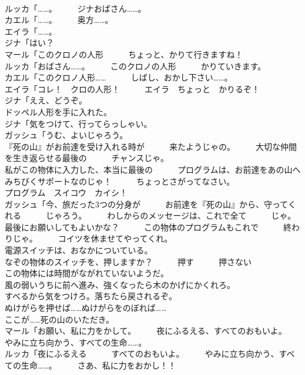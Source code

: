 \documentclass[8pt]{extreport}
\begin{document}
\begin{CJK}{UTF8}{min}
\\	ルッカ「……。　　　ジナおばさん……。	
\\	カエル「……。　　　奥方……。	
\\	エイラ「……。	
\\	ジナ「はい？	
\\	マール「このクロノの人形　　　ちょっと、かりて行きますね！	
\\	ルッカ「おばさん……。　　　このクロノの人形　　　かりていきます。	
\\	カエル「このクロノ人形……　　　しばし、おかし下さい……。	
\\	エイラ「コレ！　クロの人形！　　　エイラ　ちょっと　かりるぞ！	
\\	ジナ「ええ、どうぞ。	
\\	ドッペル人形を手に入れた。	
\\	ジナ「気をつけて、行ってらっしゃい。	
\\	ガッシュ「うむ、よいじゃろう。	
\\	『死の山』がお前達を受け入れる時が　　　来たようじゃの。　　　大切な仲間を生き返らせる最後の　　　チャンスじゃ。	
\\	私がこの物体に入力した、本当に最後の　　　プログラムは、お前達をあの山へ　　　みちびくサポートなのじゃ！　　　ちょっとさがってなさい。	
\\	プログラム　スイコウ　カイシ！	
\\	ガッシュ「今、旅だった3つの分身が　　　お前達を『死の山』から、守ってくれる　　　じゃろう。　　　わしからのメッセージは、これで全て　　　じゃ。	
\\	最後にお願いしてもよいかな？　　　この物体のプログラムもこれで　　　終わりじゃ。　　　コイツを休ませてやってくれ。	
\\	電源スイッチは、おなかについている。	
\\	なぞの物体のスイッチを、押しますか？　　　押す　　　押さない	
\\	この物体には時間がながれていないようだ。	
\\	風の弱いうちに前へ進み、強くなったら木のかげにかくれろ。	
\\	すべるから気をつけろ。落ちたら戻されるぞ。	
\\	ぬけがらを押せば……ぬけがらをのぼれば……	
\\	ここが……死の山のいただき。	
\\	マール「お願い、私に力をかして。　　　夜にふるえる、すべてのおもいよ。　　　やみに立ち向かう、すべての生命……。	
\\	ルッカ「夜にふるえる　　　すべてのおもいよ。　　　やみに立ち向かう、すべての生命……。　　　さあ、私に力をおかし！！	

\end{CJK}
\end{document}
